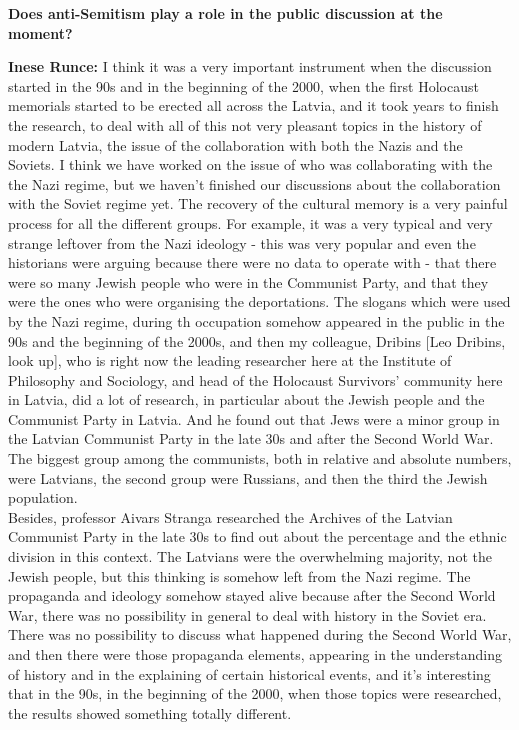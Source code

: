 \textbf{Does anti-Semitism play a role in the public discussion at the moment?}

\textbf{Inese Runce:} I think it was a very important instrument when the discussion started in the 90s and in the beginning of the 2000, when the first Holocaust memorials started to be erected all across the Latvia, and it took years to finish the research, to deal with all of this not very pleasant topics in the history of modern Latvia, the issue of the collaboration with both the Nazis and the Soviets. I think we have worked on the issue of who was collaborating with the the Nazi regime, but we haven’t finished our discussions about the collaboration with the Soviet regime yet.
The recovery of the cultural memory is a very painful process for all the different groups. For example, it was a very typical and very strange leftover from the Nazi ideology - this was very popular and even the historians were arguing because there were no data to operate with - that there were so many Jewish people who were in the Communist Party, and that they were the ones who were organising the deportations. The slogans which were used by the Nazi regime,  during th occupation somehow appeared in the public in the 90s and the beginning of the 2000s, and then my colleague, Dribins [Leo Dribins, look up], who is right now the leading researcher here at the Institute of Philosophy and Sociology, and head of the Holocaust Survivors' community here in Latvia, did a lot of research, in particular about the Jewish people and the Communist Party in Latvia. And he found out that Jews were a minor group in the Latvian Communist Party in the late 30s and after the Second World War. The biggest group among the communists, both in relative and absolute numbers, were Latvians, the second group were Russians, and then the third the Jewish population.\\
Besides, professor Aivars Stranga researched the Archives of the Latvian Communist Party in the late 30s to find out about the percentage and the ethnic division in this context. The Latvians were the overwhelming majority, not the Jewish people, but this thinking is somehow left from the Nazi regime. The propaganda and ideology somehow stayed alive because after the Second World War, there was no possibility in general to deal with history in the Soviet era. There was no possibility to discuss what happened during the Second World War, and then there were those propaganda elements, appearing in the understanding of history and in the explaining of certain historical events, and it's interesting that in the 90s, in the beginning of the 2000, when those topics were researched, the results showed something totally different.

